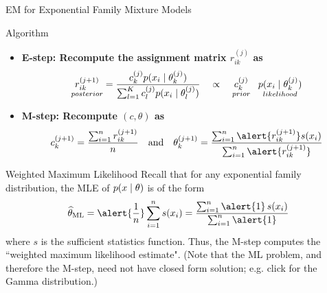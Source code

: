 \documentclass[10pt]{beamer}
\newcommand{\sumn}{\sum_{i=1}^{n}}
\newcommand{\soft}{r} %
\begin{document}
\begin{frame}{EM for Exponential Family Mixture Models}
\scriptsize
\begin{sblock}{Algorithm}
\begin{itemize}
\item \bf{E-step:} Recompute the assignment matrix $\soft_{ik}^{(j)}$ as
\[ \underset{posterior}{\soft_{ik}^{(j+1)}} = \df{ c_k^{(j)}  p(x_i \cond \theta_k^{(j)}) }{ \sum_{l=1}^K c_l^{(j)}  p(x_i \cond \theta_l^{(j)})} \quad \propto\quad  \underset{prior}{c_k^{(j)}} \;\;\; \underset{likelihood}{p(x_i \cond \theta_k^{(j)})}\]
\pause 
\item \bf{M-step:} Recompute $(c,\theta)$ as
\[ c_k^{(j+1)}  = \df{\sum_{i=1}^n \soft_{ik}^{(j+1)}}{n} \quad \text{and} \quad \theta_k^{(j+1)} = \df{\sumn \alert{\soft_{ik}^{(j+1)}} s(x_i)}{ \sumn \alert{\soft_{ik}^{(j+1)}}}\]
\end{itemize}
\end{sblock}
\begin{sblock}{Weighted Maximum Likelihood}
Recall that for any exponential family distribution, the MLE of $p(x \; | \; \theta)$ is of the form 
\[\widehat{\theta}_{\text{ML}} =\alert{\frac{1}{n}} \sumn s(x_i) = \df{\sumn \alert{1} \, s(x_i) }{ \sumn \alert{1} } \]
where $s$ is the sufficient statistics function.  Thus, the M-step computes the ``weighted maximum likelihood estimate".   \pause \tiny (Note that the ML problem, and therefore the M-step, need not have closed form solution; e.g. click  for the Gamma distribution.)
\end{sblock}


\end{frame}
\end{document}
